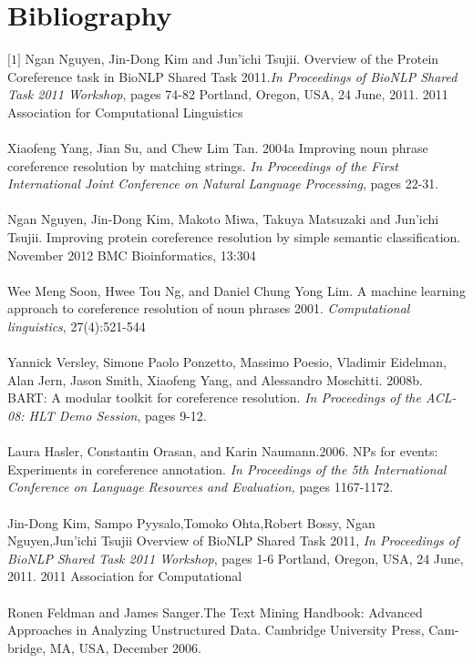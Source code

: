 \chapter{Bibliography}
\label{Bibliography}
$\big[1\big]$ Ngan Nguyen, Jin-Dong Kim and Jun'ichi Tsujii. Overview of the Protein Coreference task in BioNLP Shared Task 2011.\emph{In Proceedings of BioNLP Shared Task 2011 Workshop}, pages 74-82 Portland, Oregon, USA, 24 June, 2011.  2011 Association for Computational Linguistics\\  \\ 
\big[2\big] Xiaofeng Yang, Jian Su, and Chew Lim Tan. 2004a Improving noun phrase coreference resolution by matching strings. \emph{In Proceedings of the First International Joint Conference on Natural Language Processing}, pages 22-31.\\  \\
\big[3\big] Ngan Nguyen, Jin-Dong Kim, Makoto Miwa, Takuya Matsuzaki and Jun'ichi Tsujii. Improving protein coreference resolution by simple semantic classification. November 2012 BMC Bioinformatics, 13:304\\  \\
\big[4\big] Wee Meng Soon, Hwee Tou Ng, and Daniel Chung Yong Lim. A machine learning approach to coreference resolution of noun phrases 2001. \emph{Computational linguistics}, 27(4):521-544\\  \\
\big[5\big] Yannick Versley, Simone Paolo Ponzetto, Massimo Poesio, Vladimir Eidelman, Alan Jern, Jason Smith, Xiaofeng Yang, and Alessandro Moschitti. 2008b. BART: A modular toolkit for coreference resolution. \emph{In Proceedings of the ACL-08: HLT Demo Session}, pages 9-12.\\  \\
\big[6\big]Laura Hasler, Constantin Orasan, and Karin Naumann.2006. NPs for events: Experiments in coreference annotation. \emph{In Proceedings of the 5th International Conference on Language Resources and Evaluation,} pages 1167-1172.\\  \\
\big[7\big] Jin-Dong Kim, Sampo Pyysalo,Tomoko Ohta,Robert Bossy, Ngan Nguyen,Jun'ichi Tsujii Overview of BioNLP Shared Task 2011, \emph{In Proceedings of BioNLP Shared Task 2011 Workshop}, pages 1-6 Portland, Oregon, USA, 24 June, 2011.  2011 Association for Computational \\  \\
\big[8\big]   Ronen Feldman and James Sanger.The Text Mining Handbook:  Advanced Approaches in Analyzing Unstructured Data.   Cambridge University Press, Cam-bridge, MA, USA, December 2006.\\  \\
